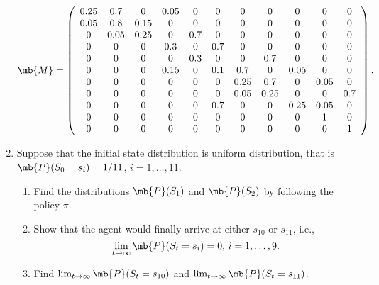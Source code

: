 \begin{exercise}
\begin{enumerate}
            \begin{solution}
                \begin{align*}
                    \mb{M} = \left(
                    \begin{array}{ccccccccccc}
                            0.25 & 0.7  & 0    & 0.05 & 0   & 0   & 0    & 0    & 0    & 0    & 0   \\
                            0.05 & 0.8  & 0.15 & 0    & 0   & 0   & 0    & 0    & 0    & 0    & 0   \\
                            0    & 0.05 & 0.25 & 0    & 0.7 & 0   & 0    & 0    & 0    & 0    & 0   \\
                            0    & 0    & 0    & 0.3  & 0   & 0.7 & 0    & 0    & 0    & 0    & 0   \\
                            0    & 0    & 0    & 0    & 0.3 & 0   & 0    & 0.7  & 0    & 0    & 0   \\
                            0    & 0    & 0    & 0.15 & 0   & 0.1 & 0.7  & 0    & 0.05 & 0    & 0   \\
                            0    & 0    & 0    & 0    & 0   & 0   & 0.25 & 0.7  & 0    & 0.05 & 0   \\
                            0    & 0    & 0    & 0    & 0   & 0   & 0.05 & 0.25 & 0    & 0    & 0.7 \\
                            0    & 0    & 0    & 0    & 0   & 0.7 & 0    & 0    & 0.25 & 0.05 & 0   \\
                            0    & 0    & 0    & 0    & 0   & 0   & 0    & 0    & 0    & 1    & 0   \\
                            0    & 0    & 0    & 0    & 0   & 0   & 0    & 0    & 0    & 0    & 1
                        \end{array}
                    \right).
                \end{align*}
                \qedhere
            \end{solution}

        \item Suppose that the initial state distribution is uniform distribution, that is $\mb{P}(S_0=s_i)=1/11$, $i=1,\ldots,11$.
            \begin{enumerate}
                \item
                    Find the distributions $\mb{P}(S_1)$ and $\mb{P}(S_2)$ by following the policy $\pi$.
                \item \label{exercise:gw-ap}
                    Show that the agent would finally arrive at either $s_{10}$ or $s_{11}$, i.e., $$\lim_{t\rightarrow\infty}\mb{P}(S_t=s_i)=0,\,i=1,\ldots,9.$$
                \item
                    Find $\lim_{t\rightarrow\infty}\mb{P}(S_t=s_{10})$ and $\lim_{t\rightarrow\infty}\mb{P}(S_t=s_{11})$.
            \end{enumerate}


\end{enumerate}
\end{exercise}

